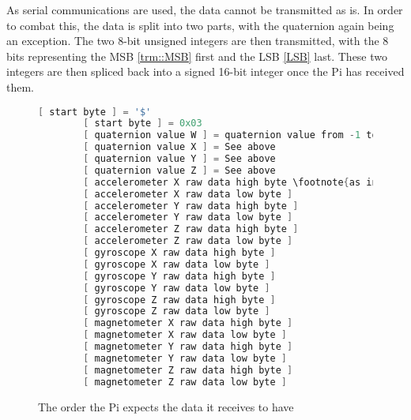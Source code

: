 As serial communications are used, the data cannot be transmitted as is.
In order to combat this, the data is split into two parts, with the quaternion again being an exception.
The two 8-bit unsigned integers are then transmitted, with the 8 bits representing the MSB \ref{trm::MSB} first and the LSB \ref{LSB} last.
These two integers are then spliced back into a signed 16-bit integer once the Pi has received them.


\begin{figure}[H]
    \begin{lstlisting}[language=c++,firstnumber=0]
        [ start byte ] = '$'
        [ start byte ] = 0x03
        [ quaternion value W ] = quaternion value from -1 to +1, multiplied by 100
        [ quaternion value X ] = See above
        [ quaternion value Y ] = See above
        [ quaternion value Z ] = See above
        [ accelerometer X raw data high byte \footnote{as in, the actual unprocessed data from the register of the MPU9250, not in m/s^{2}} ]
        [ accelerometer X raw data low byte ]
        [ accelerometer Y raw data high byte ]
        [ accelerometer Y raw data low byte ]
        [ accelerometer Z raw data high byte ]
        [ accelerometer Z raw data low byte ]
        [ gyroscope X raw data high byte ]
        [ gyroscope X raw data low byte ]
        [ gyroscope Y raw data high byte ]
        [ gyroscope Y raw data low byte ]
        [ gyroscope Z raw data high byte ]
        [ gyroscope Z raw data low byte ]
        [ magnetometer X raw data high byte ]
        [ magnetometer X raw data low byte ]
        [ magnetometer Y raw data high byte ]
        [ magnetometer Y raw data low byte ]
        [ magnetometer Z raw data high byte ]
        [ magnetometer Z raw data low byte ]
    \end{lstlisting} 
\caption{The order the Pi expects the data it receives to have}
\label{fig::dataformat}
\end{figure}


        
        
        